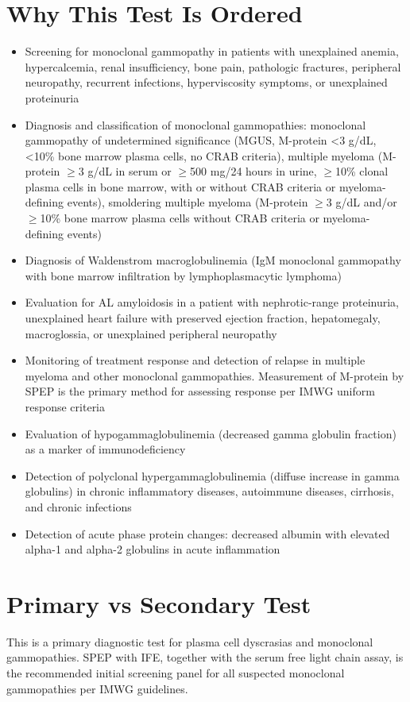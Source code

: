 \section*{Why This Test Is Ordered}
\begin{itemize}
  \item Screening for monoclonal gammopathy in patients with unexplained anemia, hypercalcemia, renal insufficiency, bone pain, pathologic fractures, peripheral neuropathy, recurrent infections, hyperviscosity symptoms, or unexplained proteinuria
  \item Diagnosis and classification of monoclonal gammopathies: monoclonal gammopathy of undetermined significance (MGUS, M-protein <3 g/dL, <10\% bone marrow plasma cells, no CRAB criteria), multiple myeloma (M-protein $\geq$3 g/dL in serum or $\geq$500 mg/24 hours in urine, $\geq$10\% clonal plasma cells in bone marrow, with or without CRAB criteria or myeloma-defining events), smoldering multiple myeloma (M-protein $\geq$3 g/dL and/or $\geq$10\% bone marrow plasma cells without CRAB criteria or myeloma-defining events)
  \item Diagnosis of Waldenstrom macroglobulinemia (IgM monoclonal gammopathy with bone marrow infiltration by lymphoplasmacytic lymphoma)
  \item Evaluation for AL amyloidosis in a patient with nephrotic-range proteinuria, unexplained heart failure with preserved ejection fraction, hepatomegaly, macroglossia, or unexplained peripheral neuropathy
  \item Monitoring of treatment response and detection of relapse in multiple myeloma and other monoclonal gammopathies. Measurement of M-protein by SPEP is the primary method for assessing response per IMWG uniform response criteria
  \item Evaluation of hypogammaglobulinemia (decreased gamma globulin fraction) as a marker of immunodeficiency
  \item Detection of polyclonal hypergammaglobulinemia (diffuse increase in gamma globulins) in chronic inflammatory diseases, autoimmune diseases, cirrhosis, and chronic infections
  \item Detection of acute phase protein changes: decreased albumin with elevated alpha-1 and alpha-2 globulins in acute inflammation
\end{itemize}

\section*{Primary vs Secondary Test}
This is a primary diagnostic test for plasma cell dyscrasias and monoclonal gammopathies. SPEP with IFE, together with the serum free light chain assay, is the recommended initial screening panel for all suspected monoclonal gammopathies per IMWG guidelines.

